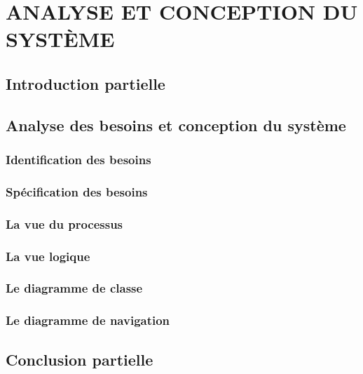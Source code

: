 \chapter[ANALYSE ET CONCEPTION DU SYSTÈME]{ANALYSE ET CONCEPTION DU SYSTÈME}
    \section[Introduction partielle]{Introduction partielle}
    \section[short]{Analyse des besoins et conception du système}
        \subsection[Identification des besoins]{Identification des besoins}
        \subsection[Spécification des besoins]{Spécification des besoins}
        \subsection[La vue du processus]{La vue du processus}
        \subsection[La vue logique]{La vue logique}
        \subsection[Le diagramme de classe]{Le diagramme de classe}
        \subsection[Le diagramme de navigation]{Le diagramme de navigation}
    \section[Conclusion partielle]{Conclusion partielle}